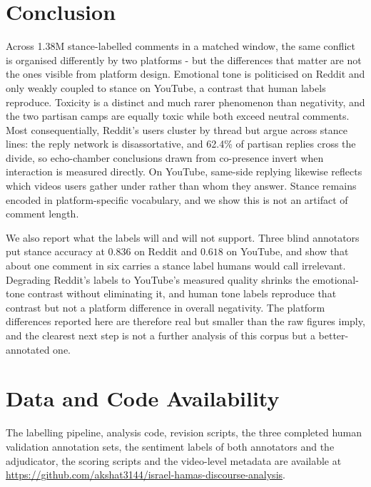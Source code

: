 \documentclass[10pt,twocolumn]{article}
\begin{document}
\section{Conclusion}
Across 1.38M stance-labelled comments in a matched window, the same conflict is
organised differently by two platforms - but the differences that matter are not the
ones visible from platform design. Emotional tone is politicised on Reddit and only
weakly coupled to stance on YouTube, a contrast that human labels reproduce.
Toxicity is a distinct and much rarer phenomenon than negativity, and the two
partisan camps are equally toxic while both exceed neutral comments. Most consequentially, Reddit's users cluster by thread but
argue across stance lines: the reply network is disassortative, and 62.4\% of
partisan replies cross the divide, so echo-chamber conclusions drawn from co-presence
invert when interaction is measured directly. On YouTube, same-side replying likewise
reflects which videos users gather under rather than whom they answer. Stance remains encoded in
platform-specific vocabulary, and we show this is not an artifact of comment length.

We also report what the labels will and will not support. Three blind annotators put
stance accuracy at $0.836$ on Reddit and $0.618$ on YouTube, and show that about one
comment in six carries a stance label humans would call irrelevant. Degrading Reddit's
labels to YouTube's measured quality shrinks the emotional-tone contrast without
eliminating it, and human tone labels reproduce that contrast but not a platform
difference in overall negativity. The platform differences reported here are therefore real but smaller
than the raw figures imply, and the clearest next step is not a further analysis of
this corpus but a better-annotated one.

\section*{Data and Code Availability}
The labelling pipeline, analysis code, revision scripts, the three completed human
validation annotation sets, the sentiment labels of both annotators and the
adjudicator, the scoring scripts and the video-level metadata are
available at \url{https://github.com/akshat3144/israel-hamas-discourse-analysis}.



\end{document}
